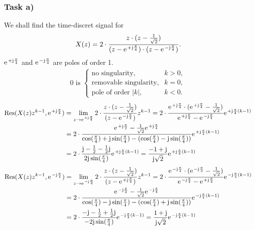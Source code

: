 \subsubsection{Task a)}
We shall find the time-discret signal for
\begin{align}
	X(z)=2\cdot\frac{z\cdot(z-\frac{1}{\sqrt{2}})}{(z-\e^{+\im\frac{\pi}{4}})\cdot(z-\e^{-\im\frac{\pi}{4}})}.
\end{align}
$\e^{+\im\frac{\pi}{4}}$ and $\e^{-\im\frac{\pi}{4}}$ are poles of order 1.\\
\begin{align}
	0\text{ is }
	\begin{cases}
	\text{no singularity}, &k > 0, \\
	\text{removable singularity}, &k = 0, \\
	\text{pole of order }|k|, &k <0. 
\end{cases}
\end{align}
\begin{align}
	\mathrm{Res}(X(z)z^{k-1},\e^{+\im\frac{\pi}{4}})&=\lim\limits_{z\rightarrow\e^{+\im\frac{\pi}{4}}}2\cdot\frac{z\cdot(z-\frac{1}{\sqrt{2}})}{(z-\e^{-\im\frac{\pi}{4}})}z^{k-1}=2\cdot\frac{\e^{+\im\frac{\pi}{4}}\cdot(\e^{+\im\frac{\pi}{4}}-\frac{1}{\sqrt{2}})}{\e^{+\im\frac{\pi}{4}}-\e^{-\im\frac{\pi}{4}}}\e^{+\im\frac{\pi}{4}(k-1)} \nonumber \\
	&=2\cdot\frac{\e^{+\im\frac{\pi}{2}}-\frac{1}{\sqrt{2}}\e^{+\im\frac{\pi}{4}}}{\cos(\frac{\pi}{4})+\im\sin(\frac{\pi}{4})-(\cos(\frac{\pi}{4})-\im\sin(\frac{\pi}{4}))}\e^{+\im\frac{\pi}{4}(k-1)}\nonumber\\
	&=2\cdot\frac{\im-\frac{1}{2}-\frac{1}{2}\im}{2\im\sin(\frac{\pi}{4})}\e^{+\im\frac{\pi}{4}(k-1)}=\frac{-1+\im}{\im\sqrt{2}}\e^{+\im\frac{\pi}{4}(k-1)}
\end{align}
\begin{align}
	\mathrm{Res}(X(z)z^{k-1},\e^{-\im\frac{\pi}{4}})&=\lim\limits_{z\rightarrow\e^{-\im\frac{\pi}{4}}}2\cdot\frac{z\cdot(z-\frac{1}{\sqrt{2}})}{(z-\e^{+\im\frac{\pi}{4}})}z^{k-1}=2\cdot\frac{\e^{-\im\frac{\pi}{4}}\cdot(\e^{-\im\frac{\pi}{4}}-\frac{1}{\sqrt{2}})}{\e^{-\im\frac{\pi}{4}}-\e^{+\im\frac{\pi}{4}}}\e^{-\im\frac{\pi}{4}(k-1)} \nonumber \\
	&=2\cdot\frac{\e^{-\im\frac{\pi}{2}}-\frac{1}{\sqrt{2}}\e^{-\im\frac{\pi}{4}}}{\cos(\frac{\pi}{4})-\im\sin(\frac{\pi}{4})-(\cos(\frac{\pi}{4})+\im\sin(\frac{\pi}{4}))}\e^{-\im\frac{\pi}{4}(k-1)}\nonumber\\
	&=2\cdot\frac{-\im-\frac{1}{2}+\frac{1}{2}\im}{-2\im\sin(\frac{\pi}{4})}\e^{-\im\frac{\pi}{4}(k-1)}=\frac{1+\im}{\im\sqrt{2}}\e^{-\im\frac{\pi}{4}(k-1)}
\end{align}
